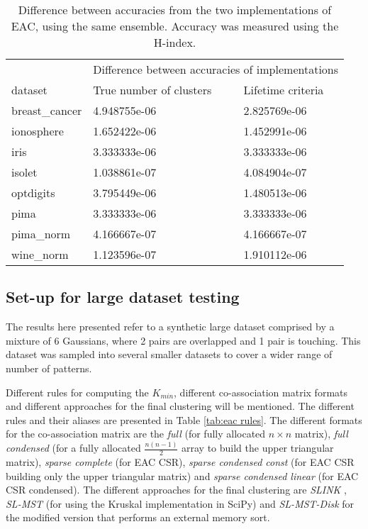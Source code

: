 \begin{table}[h]
\centering
\caption{Difference between accuracies from the two implementations of EAC, using the same ensemble. Accuracy was measured using the H-index.}

\begin{tabular}{lll}
\toprule
         &        \multicolumn{2}{c}{Difference between accuracies of implementations} \\
dataset &      True number of clusters & Lifetime criteria \\
\midrule
breast\_cancer &  4.948755e-06 &     2.825769e-06 \\
ionosphere     &  1.652422e-06 &     1.452991e-06 \\
iris           &  3.333333e-06 &     3.333333e-06 \\
isolet         &  1.038861e-07 &     4.084904e-07 \\
optdigits      &  3.795449e-06 &     1.480513e-06 \\
pima           &  3.333333e-06 &     3.333333e-06 \\
pima\_norm     &  4.166667e-07 &     4.166667e-07 \\
wine\_norm     &  1.123596e-07 &     1.910112e-06 \\
\bottomrule
\end{tabular}

\label{tab:validation error acc}
\end{table}

\subsection{Set-up for large dataset testing}
The results here presented refer to a synthetic large dataset comprised by a mixture of 6 Gaussians, where 2 pairs are overlapped and 1 pair is touching.
This dataset was sampled into several smaller datasets to cover a wider range of number of patterns.

Different rules for computing the $K_{min}$, different co-association matrix formats and different approaches for the final clustering will be mentioned.
The different rules and their aliases are presented in Table \ref{tab:eac rules}.
The different formats for the co-association matrix are the \emph{full} (for fully allocated $n \times n$ matrix), \emph{full condensed} (for a fully allocated $\frac{n(n-1)}{2}$ array to build the upper triangular matrix), \emph{sparse complete} (for EAC CSR), \emph{sparse condensed const} (for EAC CSR building only the upper triangular matrix) and \emph{sparse condensed linear} (for EAC CSR condensed).
The different approaches for the final clustering are \emph{SLINK} \cite{Sibson1973}, \emph{SL-MST} (for using the Kruskal implementation in SciPy) and \emph{SL-MST-Disk} for the modified version that performs an external memory sort.

